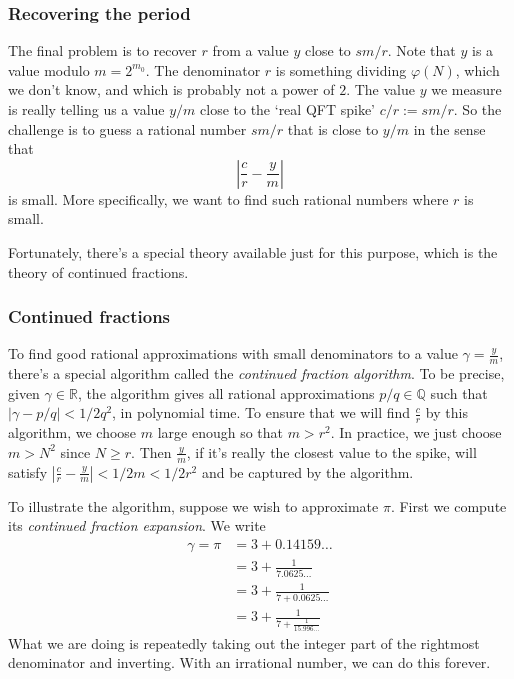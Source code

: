 \documentclass{article}
\theoremstyle{plain}
\theoremstyle{definition}
\theoremstyle{remark}
\numberwithin{theorem}{section}
\begin{document}
\subsubsection{Recovering the period}

The final problem is to recover $r$ from a value $y$ close to $sm/r$.  Note that $y$ is a value modulo $m = 2^{m_0}$.  The denominator $r$ is something dividing $\varphi(N)$, which we don't know, and which is probably not a power of $2$.  The value $y$ we measure is really telling us a value $y/m$ close to the `real QFT spike' $ c/ r := s m/r$.  
 So the challenge is to guess a rational number $sm/r$ that is close to $y/m$ in the sense that
 \[ 
 \left| \frac{c}{r} - \frac{y}{m} \right| 
 \]
 is small.  More specifically, we want to find such rational numbers where $r$ is small.

 Fortunately, there's a special theory available just for this purpose, which is the theory of continued fractions.

 \subsubsection{Continued fractions}

 To find good rational approximations with small denominators to a value $\gamma = \frac{y}{m}$, there's a special algorithm called the \emph{continued fraction algorithm}.  
 To be precise, given $\gamma \in \mathbb{R}$, the algorithm gives all rational approximations $p/q \in \mathbb{Q}$ such that $|\gamma - p/q| < 1/2q^2$, in polynomial time.  
 To ensure that we will find $\frac{c}{r}$ by this algorithm, we choose $m$ large enough so that $m > r^2$.  In practice, we just choose $m > N^2$ since $N \ge r$.
 Then $\frac{y}{m}$, if it's really the closest value to the spike, will satisfy $| \frac{c}{r} - \frac{y}{m} | < 1/2m < 1/2r^2$ and be captured by the algorithm.

 To illustrate the algorithm, suppose we wish to approximate $\pi$.  First we compute its \emph{continued fraction expansion}.  We write
 \begin{align*}
 \gamma = \pi &= 3 + 0.14159\ldots \\
 &= 3 + \frac{1}{7.0625\ldots} \\
  &= 3 + \frac{1}{7 + 0.0625\ldots} \\
  &= 3 + \frac{1}{7 + \frac{1}{15.996\ldots}}
 \end{align*}
 What we are doing is repeatedly taking out the integer part of the rightmost denominator and inverting.  With an irrational number, we can do this forever.
\end{document}
